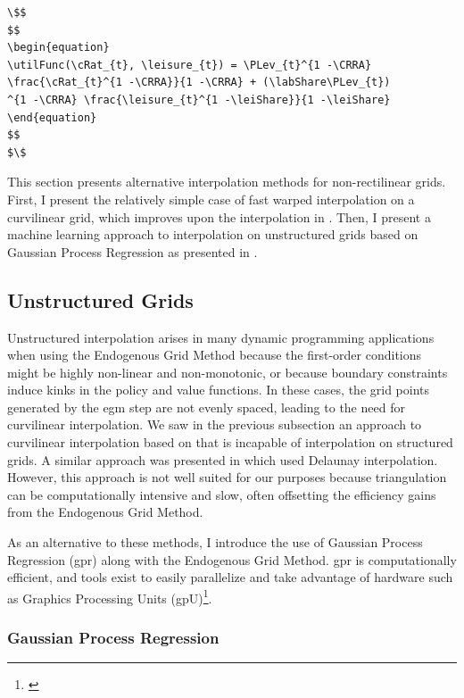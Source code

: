 \documentclass{article}
\begin{document}
\begin{verbatim}
\$$
$$
\begin{equation}
\utilFunc(\cRat_{t}, \leisure_{t}) = \PLev_{t}^{1 -\CRRA} \frac{\cRat_{t}^{1 -\CRRA}}{1 -\CRRA} + (\labShare\PLev_{t})
^{1 -\CRRA} \frac{\leisure_{t}^{1 -\leiShare}}{1 -\leiShare}
\end{equation}
$$
$\$
\end{verbatim}

This section presents alternative interpolation methods for non-rectilinear grids. First, I present the relatively simple case of fast warped interpolation on a curvilinear grid, which improves upon the interpolation in \citet{White2015}. Then, I present a machine learning approach to interpolation on unstructured grids based on Gaussian Process Regression as presented in \citet{Scheidegger2019}.

\subsection{Unstructured Grids}

Unstructured interpolation arises in many dynamic programming applications when using the Endogenous Grid Method because the first-order conditions might be highly non-linear and non-monotonic, or because boundary constraints induce kinks in the policy and value functions. In these cases, the grid points generated by the \acrshort{egm} step are not evenly spaced, leading to the need for curvilinear interpolation. We saw in the previous subsection an approach to curvilinear interpolation based on \citet{White2015} that is incapable of interpolation on structured grids. A similar approach was presented in \citet{Ludwig2018} which used Delaunay interpolation. However, this approach is not well suited for our purposes because triangulation can be computationally intensive and slow, often offsetting the efficiency gains from the Endogenous Grid Method.

As an alternative to these methods, I introduce the use of Gaussian Process Regression (\acrshort{gpr}) along with the Endogenous Grid Method. \acrshort{gpr} is computationally efficient, and tools exist to easily parallelize and take advantage of hardware such as Graphics Processing Units (\acrshort{gp}U)\footnote{\citet{Gardner2018}}.


\subsubsection{Gaussian Process Regression}
\end{document}
